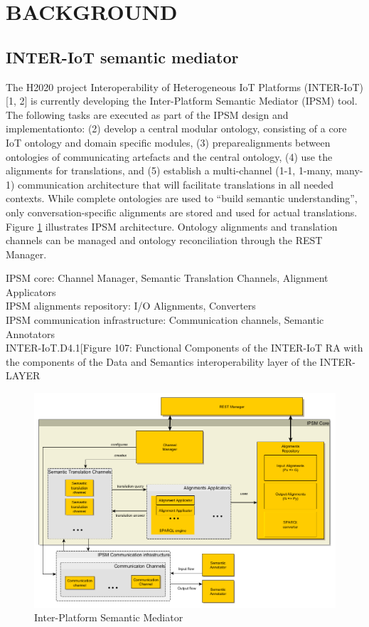 \documentclass{sig-alternate-05-2015}
\begin{document}
\section{BACKGROUND}

\subsection{INTER-IoT semantic mediator}
The H2020 project Interoperability of Heterogeneous IoT Platforms (INTER-IoT) [1, 2] is currently developing the  Inter-Platform Semantic Mediator (IPSM) tool. The following tasks are executed as part of the IPSM design and implementationto:  (2) develop a central modular ontology, consisting of a core IoT ontology and domain specific modules, (3) preparealignments between ontologies of communicating artefacts and the central ontology,  (4) use the alignments for translations, and (5) establish a multi-channel (1-1, 1-many, many-1) communication architecture that will facilitate translations in all needed contexts. While complete ontologies are used to “build semantic understanding”, only conversation-specific alignments are stored and used for actual translations. Figure \ref{fig:IPSM} illustrates IPSM architecture. Ontology alignments and translation channels can be managed and ontology reconciliation  through the REST Manager.

IPSM core: Channel Manager, Semantic Translation Channels, Alignment Applicators \\
IPSM alignments repository: I/O Alignments, Converters \\
IPSM communication infrastructure: Communication channels, Semantic Annotators \\

INTER-IoT.D4.1[Figure 107: Functional Components of the INTER-IoT RA with the components of the Data and Semantics interoperability layer of the INTER-LAYER\\

\begin{figure}[h!]
\centering
\includegraphics[scale=0.22]{IPSM}
\caption{Inter-Platform Semantic Mediator}
\label{fig:IPSM}
\end{figure}
\end{document}
